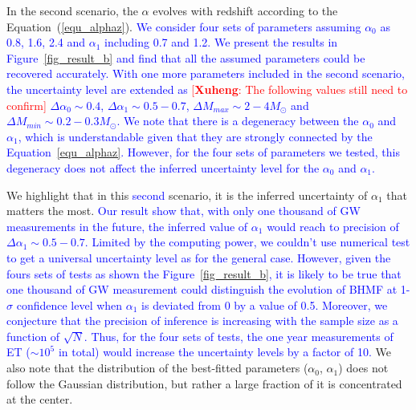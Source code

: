 \documentclass[twocolumn]{aastex62}
\newcommand{\blue}[1]{\textcolor{blue}{#1}}
\newcommand{\ding}[1]{\textcolor{red}{[{\bf Xuheng}: #1]}}
\begin{document}
In the second scenario, the $\alpha$ evolves with redshift according to the Equation~(\ref{equ_alphaz}). \blue{We consider four sets of parameters assuming $\alpha_0$ as  0.8, 1.6, 2.4 and $\alpha_1$ including 0.7 and 1.2. We present the results in Figure~\ref{fig_result_b} and find that all the assumed parameters could be recovered accurately. With one more parameters included in the second scenario, the uncertainty level are extended as \ding{The following values still need to confirm} $\Delta\alpha_0\sim0.4$, $\Delta\alpha_1\sim0.5-0.7$, $\Delta M_{max}\sim2-4M_{\odot}$ and $\Delta M_{min}\sim0.2-0.3M_{\odot}$. We note that there is a degeneracy between the $\alpha_0$ and $\alpha_1$, which is understandable given that they are strongly connected by the Equation~\ref{equ_alphaz}. However, for the four sets of parameters we tested, this degeneracy does not affect the inferred uncertainty level for the $\alpha_0$ and $\alpha_1$.
}

We highlight that in this \blue{second} scenario, it is the inferred uncertainty of $\alpha_1$ that matters the most. \blue{Our result show that, with only one thousand of GW measurements in the future, the inferred value of $\alpha_1$ would reach to precision of $\Delta\alpha_1\sim0.5-0.7$. Limited by the computing power, we couldn't use numerical test to get a universal uncertainty level as for the general case. However, given the fours sets of tests as shown the Figure~\ref{fig_result_b}, it is likely to be true that one thousand of GW measurement could distinguish the evolution of BHMF at 1-$\sigma$ confidence level when $\alpha_1$ is deviated from 0 by a value of 0.5. 
Moreover, we conjecture that the precision of inference is increasing with the sample size as a function of $\sqrt{N}$. Thus, for the four sets of tests, the one year measurements of ET ($\sim10^5$ in total) would increase the uncertainty levels by a factor of 10.}
We also note that the distribution of the best-fitted parameters ($\alpha_0$, $\alpha_1$) does not follow the Gaussian distribution, but rather a large fraction of it is concentrated at the center.
\end{document}
